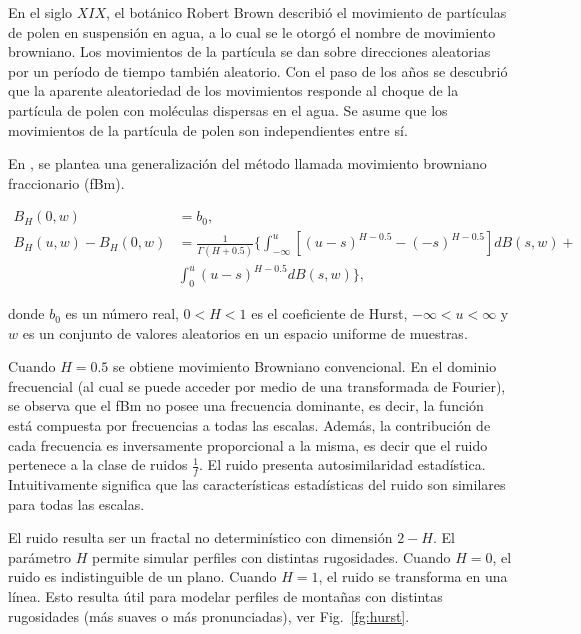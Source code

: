 En el siglo $XIX$, el botánico Robert Brown describió el movimiento de partículas de polen en suspensión en agua, a lo cual se le otorgó el nombre de movimiento browniano.
Los movimientos de la partícula se dan sobre direcciones aleatorias por un período de tiempo también aleatorio.
Con el paso de los años se descubrió que la aparente aleatoriedad de los movimientos responde al choque de la partícula de polen con moléculas dispersas en el agua.
Se asume que los movimientos de la partícula de polen son independientes entre sí.

En \cite{Mandelbrot1968}, se plantea una generalización del método llamada movimiento browniano fraccionario (\acrshort{fBm}). 

\begin{align*}
B_{H}(0,w) &= b_{0},\\
B_{H}(u,w)- B_{H}(0,w) &= \frac{1}{\Gamma(H+0.5)} \big\{ \int_{-\infty}^{u} [(u-s)^{H-0.5} - (-s)^{H-0.5} ] dB(s,w) + \\
&  \int_{0}^{u} (u-s)^{H-0.5} dB(s,w) \big \},
\end{align*}


donde $b_{0}$ es un número real, $0 < H < 1$ es el coeficiente de Hurst, $-\infty < u < \infty $ y $w$ es un conjunto de valores aleatorios en un espacio uniforme de muestras.

Cuando $H = 0.5$ se obtiene movimiento Browniano convencional.
En el dominio frecuencial (al cual se puede acceder por medio de una transformada de Fourier), se observa que el fBm no posee una frecuencia dominante, es decir, la función está compuesta por frecuencias a todas las escalas.
Además, la contribución de cada frecuencia es inversamente proporcional a la misma, es decir que el ruido pertenece a la clase de ruidos $\frac{1}{f}$.
El ruido presenta autosimilaridad estadística.
Intuitivamente significa que las características estadísticas del ruido son similares para todas las escalas.

El ruido resulta ser un fractal no determinístico con dimensión $2-H$.
El parámetro $H$ permite simular perfiles con distintas rugosidades.
Cuando $H = 0$, el ruido es indistinguible de un plano.
Cuando $H = 1$, el ruido se transforma en una línea.
Esto resulta útil para modelar perfiles de montañas con distintas rugosidades (más suaves o más pronunciadas), ver Fig.~\ref{fg:hurst}.

